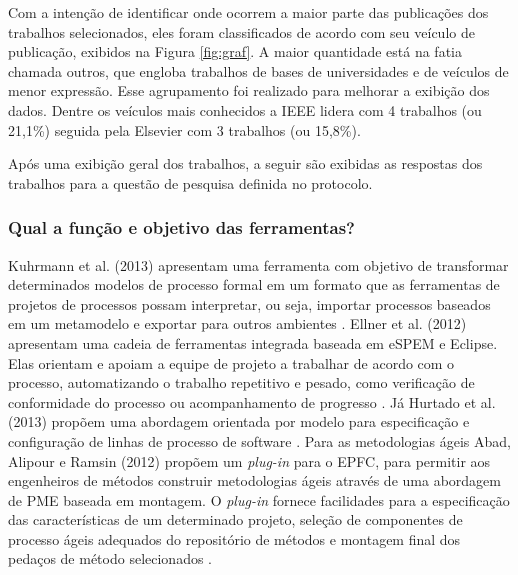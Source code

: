 Com a intenção de identificar onde ocorrem a maior parte das publicações dos trabalhos selecionados, eles foram classificados de acordo com seu veículo de publicação, exibidos na Figura \ref{fig:graf}. A maior quantidade está na fatia chamada outros, que engloba trabalhos de bases de universidades e de veículos de menor expressão. Esse agrupamento foi realizado para melhorar a exibição dos dados. Dentre os veículos mais conhecidos a IEEE lidera com 4 trabalhos (ou 21,1\%) seguida pela Elsevier com 3 trabalhos (ou 15,8\%).


Após uma exibição geral dos trabalhos, a seguir são exibidas as respostas dos trabalhos para a questão de pesquisa definida no protocolo.
\subsubsection{Qual a função e objetivo das ferramentas?}\label{subsub:trabalhosRelacionados_resultados_questao1}

 Kuhrmann et al. (2013) apresentam uma ferramenta com objetivo de transformar determinados modelos de processo formal em um formato que as ferramentas de projetos de processos possam interpretar, ou seja, importar processos baseados em um metamodelo e exportar para outros ambientes \cite{1kuhrmann:2014}. Ellner et al. (2012) apresentam uma cadeia de ferramentas integrada baseada em eSPEM e Eclipse. Elas orientam e apoiam a equipe de projeto a trabalhar de acordo com o processo, automatizando o trabalho repetitivo e pesado, como verificação de conformidade do processo ou acompanhamento de progresso \cite{10ellner:2012}. Já Hurtado et al.(2013) propõem uma abordagem orientada por modelo para especificação e configuração de linhas de processo de software \cite{8hurtado:2013}. Para as metodologias ágeis Abad, Alipour e Ramsin (2012)  propõem um \textit{plug-in} para o EPFC, para permitir aos engenheiros de métodos construir metodologias ágeis através de uma abordagem de PME baseada em montagem. O \textit{plug-in} fornece facilidades para a especificação das características de um determinado projeto, seleção de componentes de processo ágeis adequados do repositório de métodos e montagem final dos pedaços de método selecionados \cite{13abad:2012}.
 
